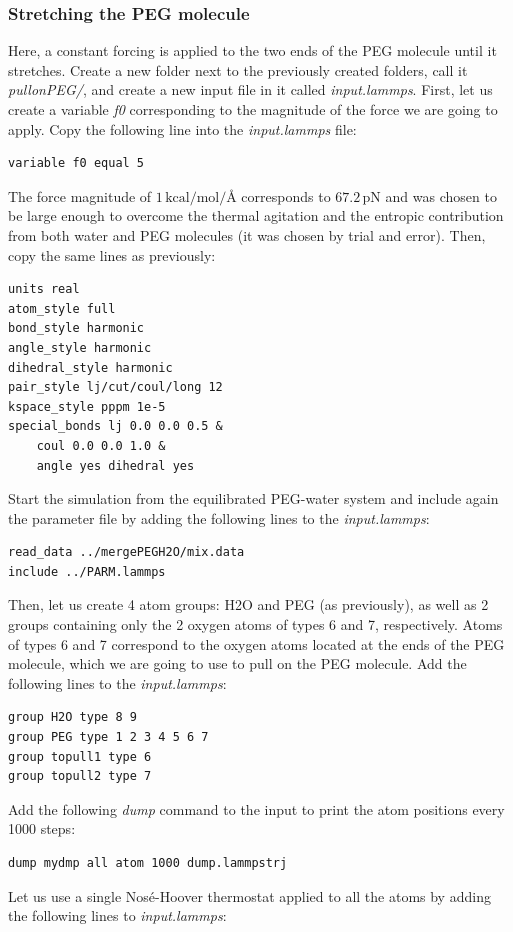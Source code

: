 \documentclass[9pt,tutorial]{livecoms}
\begin{document}
\subsubsection{Stretching the PEG molecule}
Here, a constant forcing is applied to the two ends of the PEG molecule until it stretches. Create a new folder next to the previously created folders, call it \textit{pullonPEG/}, and create a new input file in it called \textit{input.lammps}. First, let us create a variable \textit{f0} corresponding to the magnitude of the force we are going to apply. Copy the following line into the \textit{input.lammps} file:
{\normalsize \begin{verbatim}
variable f0 equal 5
\end{verbatim}}
The force magnitude of $1\,\text{kcal/mol/\AA{}}$ corresponds to $67.2\,\text{pN}$ and was chosen to be large enough to overcome the thermal agitation and the entropic contribution from both water and PEG molecules (it was chosen by trial and error). Then, copy the same lines as previously:
{\normalsize \begin{verbatim}
units real
atom_style full
bond_style harmonic
angle_style harmonic
dihedral_style harmonic
pair_style lj/cut/coul/long 12
kspace_style pppm 1e-5
special_bonds lj 0.0 0.0 0.5 &
    coul 0.0 0.0 1.0 &
    angle yes dihedral yes
\end{verbatim}}
Start the simulation from the equilibrated PEG-water system and include again the parameter file by adding the following lines to the \textit{input.lammps}:
{\normalsize \begin{verbatim}
read_data ../mergePEGH2O/mix.data
include ../PARM.lammps
\end{verbatim}}
Then, let us create 4 atom groups: H2O and PEG (as previously), as well as 2 groups containing only the 2 oxygen atoms of types 6 and 7, respectively. Atoms of types 6 and 7 correspond to the oxygen atoms located at the ends of the PEG molecule, which we are going to use to pull on the PEG molecule. Add the following lines to the \textit{input.lammps}:
{\normalsize \begin{verbatim}
group H2O type 8 9
group PEG type 1 2 3 4 5 6 7
group topull1 type 6
group topull2 type 7
\end{verbatim}}
Add the following \textit{dump} command to the input to print the atom positions every 1000 steps:
{\normalsize \begin{verbatim}
dump mydmp all atom 1000 dump.lammpstrj
\end{verbatim}}
Let us use a single Nosé-Hoover thermostat applied to all the atoms by adding the following lines to \textit{input.lammps}:
\end{document}
